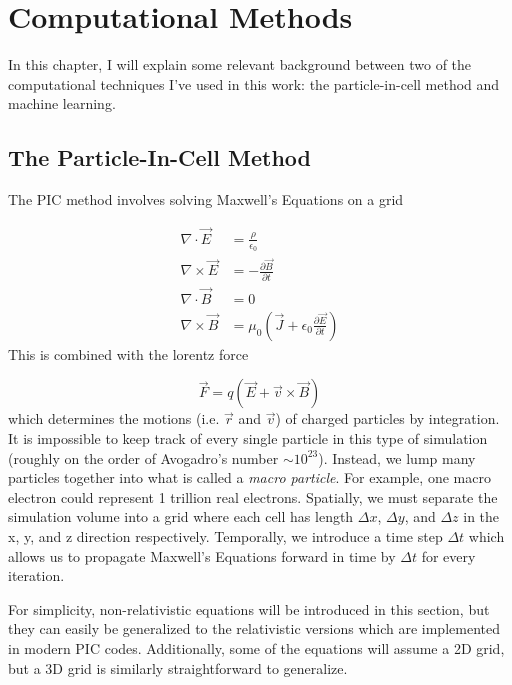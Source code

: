\chapter{Computational Methods} \label{ch:3}

In this chapter, I will explain some relevant background between two of the computational techniques I've used in this work: the particle-in-cell method and machine learning.

\section{The Particle-In-Cell Method}

The \gls{PIC} method involves solving Maxwell's Equations on a grid 

\begin{align}
	\nabla \cdot \vec{E} &= \frac{\rho}{\epsilon_0}  \label{eq:gauss} \\
	\nabla \times \vec{E} &= - \frac{\partial \vec{B}}{\partial t} \label{eq:faraday} \\
	\nabla \cdot \vec{B} &= 0 \label{eq:gauss_magnetism} \\
	\nabla \times \vec{B} &= \mu_0 (\vec{J} + \epsilon_0 \frac{\partial \vec{E}}{\partial t}) \label{eq:ampere}
\end{align}
This is combined with the lorentz force

\begin{equation}
	\vec{F} = q(\vec{E} + \vec{v} \times \vec{B}) \label{eq:lorentz_pic}
\end{equation}
which determines the motions (i.e. $\vec{r}$ and $\vec{v}$) of charged particles by integration. It is impossible to keep track of every single particle in this type of simulation (roughly on the order of Avogadro's number $\sim 10^{23}$). Instead, we lump many particles together into what is called a \emph{macro particle}. For example, one macro electron could represent 1 trillion real electrons. Spatially, we must separate the simulation volume into a grid where each cell has length $\Delta x$, $\Delta y$, and $\Delta z$ in the x, y, and z direction respectively. Temporally, we introduce a time step $\Delta t$ which allows us to propagate Maxwell's Equations forward in time by $\Delta t$ for every iteration.

For simplicity, non-relativistic equations will be introduced in this section, but they can easily be generalized to the relativistic versions which are implemented in modern PIC codes. Additionally, some of the equations will assume a 2D grid, but a 3D grid is similarly straightforward to generalize.

